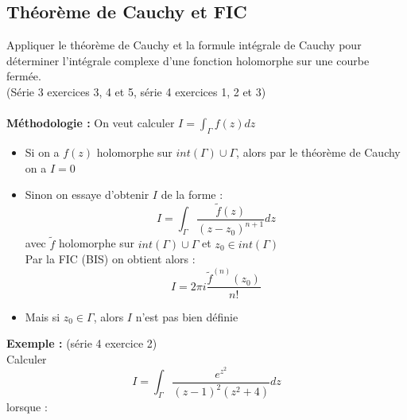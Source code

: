 \subsection{Théorème de Cauchy et FIC}
Appliquer le théorème de Cauchy et la formule intégrale de Cauchy pour déterminer l’intégrale complexe d’une fonction holomorphe sur une courbe fermée. \\
(Série 3 exercices 3, 4 et 5, série 4 exercices 1, 2 et 3)\\
\\
\textbf{Méthodologie :}
On veut calculer $I = \int_{\Gamma} f(z)dz$
\begin{itemize}
    \item Si on a $f(z)$ holomorphe sur $int(\Gamma) \cup \Gamma$, alors par le théorème de Cauchy on a $I = 0$
    \item Sinon on essaye d'obtenir $I$ de la forme :
    $$I = \int_{\Gamma} \frac{\widetilde{f}(z)}{(z-z_0)^{n+1}}dz$$
    avec $\widetilde{f}$ holomorphe sur $int(\Gamma) \cup \Gamma$ et $z_0 \in int(\Gamma)$ \\
    Par la FIC (BIS) on obtient alors :
    $$I = 2\pi i \frac{\widetilde{f}^{(n)}(z_0)}{n!}$$
    \item Mais si $z_0 \in \Gamma$, alors $I$ n'est pas bien définie
\end{itemize}
\textbf{Exemple :} (série 4 exercice 2) \\
Calculer
$$I = \int_{\Gamma} \frac{e^{z^2}}{(z-1)^2(z^2+4)}dz$$
lorsque :
